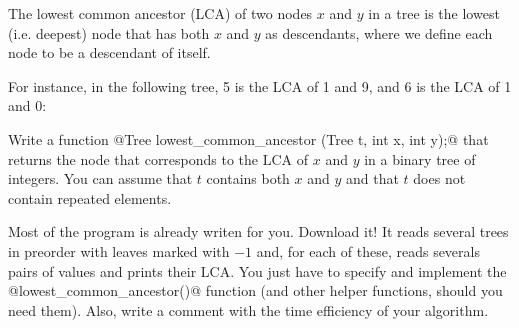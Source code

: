
\Statement

The lowest common ancestor (LCA) of two
nodes $x$ and $y$ in a tree is the lowest (i.e. deepest) node that has both
$x$ and $y$ as descendants, where we define each node to be a descendant of
itself.

\medskip

For instance, in the following tree, 5 is the LCA of 1 and 9, and 6 is the LCA
of 1 and 0:


\medskip

Write a function @Tree lowest_common_ancestor (Tree t, int x, int y);@ that
returns the node that corresponds to the LCA of $x$ and $y$ in a binary tree of integers.
You can assume that $t$ contains both $x$ and $y$ and that $t$ does not contain
repeated elements.

\medskip

Most of the program is already writen for you. Download it! It reads several trees
in preorder with leaves marked with $-1$
and, for each of these, reads severals pairs of values and prints their LCA. You just have
to specify and implement the @lowest_common_ancestor()@ function (and other helper functions,
should you need them). Also, write a comment with the time efficiency of your algorithm.

\SampleOneCol
